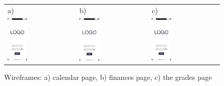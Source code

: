 \begin{figure}[htb]
    \centering
    \begin{tabular}{@{}lll@{}}
        a) & b) & c) \\
        \includegraphics[page=2,width=0.300\textwidth]{fig04/jsos_helper_wireframe.pdf} &
        \includegraphics[page=6,width=0.300\textwidth]{fig04/jsos_helper_wireframe.pdf} &
        \includegraphics[page=3,width=0.300\textwidth]{fig04/jsos_helper_wireframe.pdf} \\
    \end{tabular}
    \caption{Wireframes: a) calendar page, b) finances page, c) the grades page} \label{fig:calendar-finances-grades}
\end{figure}

